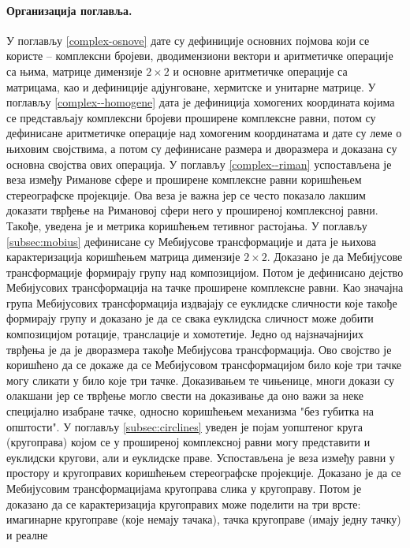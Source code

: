 \paragraph{Организација поглавља.} 
У поглављу \ref{complex-osnove} дате су дефиниције основних појмова
који се користе -- комплексни бројеви, дводимензиони вектори и
аритметичке операције са њима, матрице димензије $2 \times 2$ и
основне аритметичке операције са матрицама, као и дефиниције
адјунговане, хермитске и унитарне матрице. У поглављу
\ref{complex--homogene} дата је дефиниција хомогених координата којима
се представљају комплексни бројеви проширене комплексне равни, потом
су дефинисане аритметичке операције над хомогеним координатама и дате
су леме о њиховим својствима, а потом су дефинисане размера и
дворазмера и доказана су основна својства ових операција. У поглављу
\ref{complex--riman} успостављена је веза између Риманове сфере и
проширене комплексне равни коришћењем стереографске пројекције. Ова
веза је важна јер се често показало лакшим доказати тврђење на
Римановој сфери него у проширеној комплексној равни. Такође, уведена
је и метрика коришћењем тетивног растојања. У поглављу
\ref{subsec:mobius} дефинисане су Мебијусове трансформације и дата је
њихова карактеризација коришћењем матрица димензије $2 \times
2$. Доказано је да Мебијусове трансформације формирају групу над
композицијом. Потом је дефинисано дејство Мебијусових трансформација
на тачке проширене комплексне равни. Као значајна група Мебијусових
трансформација издвајају се еуклидске сличности које такође формирају
групу и доказано је да се свака еуклидска сличност може добити
композицијом ротације, транслације и хомотетије. Једно од
најзначајнијих тврђења је да је дворазмера такође Мебијусова
трансформација. Ово својство је коришћено да се докаже да се
Мебијусовом трансформацијом било које три тачке могу сликати у било
које три тачке. Доказивањем те чињенице, многи докази су олакшани јер
се тврђење могло свести на доказивање да оно важи за неке специјално
изабране тачке, односно коришћењем механизма "без губитка на
општости". У поглављу \ref{subsec:circlines} уведен је појам уопштеног
круга (кругоправа) којом се у проширеној комплексној равни могу
представити и еуклидски кругови, али и еуклидске праве. Успостављена
је веза између равни у простору и кругоправих коришћењем стереографске
пројекције. Доказано је да се Мебијусовим трансформацијама кругоправа
слика у кругоправу. Потом је доказано да се карактеризација
кругоправих може поделити на три врсте: имагинарне кругоправе (које
немају тачака), тачка кругоправе (имају једну тачку) и реалне
